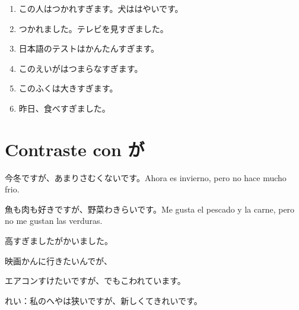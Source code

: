 \documentclass[a4paper,lualatex,ja=standard,base=10pt]{bxjsarticle}
\begin{document}
\begin{enumerate}
  \item この人はつかれすぎます。犬ははやいです。
  \item つかれました。テレビを見すぎました。
  \item 日本語のテストはかんたんすぎます。
  \item このえいがはつまらなすぎます。
  \item このふくは大きすぎます。
  \item 昨日、食べすぎました。
\end{enumerate}

\section{Contraste con が}
今冬ですが、あまりさむくないです。Ahora es invierno, pero no hace mucho frio.

魚も肉も好きですが、野菜わきらいです。Me gusta el pescado y la carne, pero no me gustan las verduras.

高すぎましたがかいました。

映画かんに行きたいんでが、

エアコンすけたいですが、でもこわれています。

れい：私のへやは狭いですが、新しくてきれいです。
\end{document}

